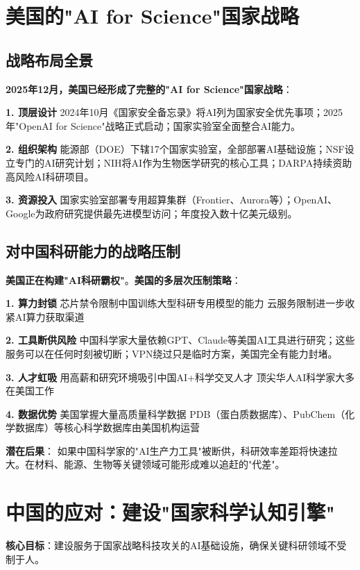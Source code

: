 \section{美国的"AI for Science"国家战略}

\subsection{战略布局全景}

\textbf{2025年12月，美国已经形成了完整的"AI for Science"国家战略}：

\textbf{1. 顶层设计}
2024年10月《国家安全备忘录》将AI列为国家安全优先事项；2025年"OpenAI for Science"战略正式启动；国家实验室全面整合AI能力。

\textbf{2. 组织架构}
能源部（DOE）下辖17个国家实验室，全部部署AI基础设施；NSF设立专门的AI研究计划；NIH将AI作为生物医学研究的核心工具；DARPA持续资助高风险AI科研项目。

\textbf{3. 资源投入}
国家实验室部署专用超算集群（Frontier、Aurora等）；OpenAI、Google为政府研究提供最先进模型访问；年度投入数十亿美元级别。

\subsection{对中国科研能力的战略压制}

\textbf{美国正在构建"AI科研霸权"}。\textbf{美国的多层次压制策略}：

\textbf{1. 算力封锁}
芯片禁令限制中国训练大型科研专用模型的能力 云服务限制进一步收紧AI算力获取渠道

\textbf{2. 工具断供风险}
中国科学家大量依赖GPT、Claude等美国AI工具进行研究；这些服务可以在任何时刻被切断；VPN绕过只是临时方案，美国完全有能力封堵。

\textbf{3. 人才虹吸}
用高薪和研究环境吸引中国AI+科学交叉人才 顶尖华人AI科学家大多在美国工作

\textbf{4. 数据优势}
美国掌握大量高质量科学数据 PDB（蛋白质数据库）、PubChem（化学数据库）等核心科学数据库由美国机构运营

\textbf{潜在后果}：
如果中国科学家的"AI生产力工具"被断供，科研效率差距将快速拉大。在材料、能源、生物等关键领域可能形成难以追赶的"代差"。

\section{中国的应对：建设"国家科学认知引擎"}

\textbf{核心目标}：建设服务于国家战略科技攻关的AI基础设施，确保关键科研领域不受制于人。

